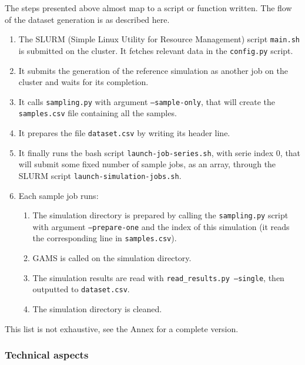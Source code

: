 The steps presented above almost map to a script or function written. The flow of the dataset generation is as described here.

\begin{enumerate}
    \item The SLURM (Simple Linux Utility for Resource Management) script \texttt{main.sh} is submitted on the cluster. It fetches relevant data in the \texttt{config.py} script.
    \item It submits the generation of the reference simulation as another job on the cluster and waits for its completion.
    \item It calls \texttt{sampling.py} with argument \texttt{--sample-only}, that will create the \texttt{samples.csv} file containing all the samples.
    \item It prepares the file \texttt{dataset.csv} by writing its header line.
    \item It finally runs the bash script \texttt{launch-job-series.sh}, with serie index 0, that will submit some fixed number of sample jobs, as an array, through the SLURM script \texttt{launch-simulation-jobs.sh}.
    \item Each sample job runs:
    \begin{enumerate}
        \item The simulation directory is prepared by calling the \texttt{sampling.py} script with argument \texttt{--prepare-one} and the index of this simulation (it reads the corresponding line in \texttt{samples.csv}).
        \item GAMS is called on the simulation directory.
        \item The simulation results are read with \texttt{read\_results.py --single}, then outputted to \texttt{dataset.csv}.
        \item The simulation directory is cleaned.
    \end{enumerate}
\end{enumerate}

This list is not exhaustive, see the Annex for a complete version.

\subsubsection{Technical aspects}

